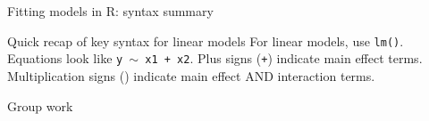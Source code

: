 \documentclass[table]{beamer}\usepackage[]{graphicx}\usepackage[]{color}
\begin{document}

\begin{frame}[fragile]{Fitting models in R: syntax summary}

\begin{block}{Quick recap of key syntax for linear models}
\bi
  \myitem For linear models, use {\tt lm()}.
  \myitem Equations look like {\tt y $\sim$ x1 + x2}.
  \myitem Plus signs ({\tt +}) indicate main effect terms.
  \myitem Multiplication signs ({\tt *}) indicate main effect AND interaction terms.
\ei
\end{block}

\end{frame}






\begin{frame}[fragile]{Group work}


\end{frame}
\end{document}
